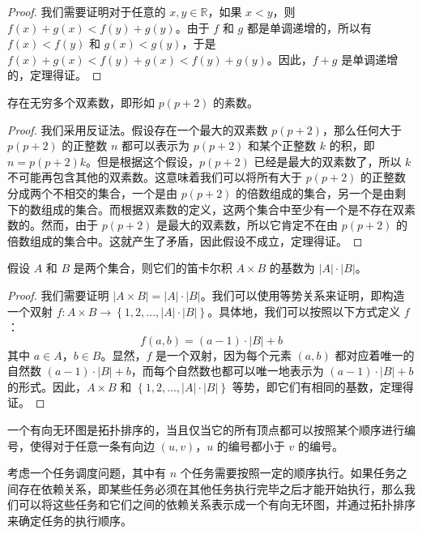 \begin{proof}
  我们需要证明对于任意的 $x,y \in \mathbb{R}$，如果 $x < y$，则 $f(x)+g(x) < f(y)+g(y)$。由于 $f$ 和 $g$ 都是单调递增的，所以有 $f(x) < f(y)$ 和 $g(x) < g(y)$，于是 $f(x)+g(x) < f(y)+g(x) < f(y)+g(y)$。因此，$f+g$ 是单调递增的，定理得证。
\end{proof}

\begin{conj}
  存在无穷多个双素数，即形如 $p(p+2)$ 的素数。
\end{conj}

\begin{proof}
  我们采用反证法。假设存在一个最大的双素数 $p(p+2)$，那么任何大于 $p(p+2)$ 的正整数 $n$ 都可以表示为 $p(p+2)$ 和某个正整数 $k$ 的积，即 $n = p(p+2)k$。但是根据这个假设，$p(p+2)$ 已经是最大的双素数了，所以 $k$ 不可能再包含其他的双素数。这意味着我们可以将所有大于 $p(p+2)$ 的正整数分成两个不相交的集合，一个是由 $p(p+2)$ 的倍数组成的集合，另一个是由剩下的数组成的集合。而根据双素数的定义，这两个集合中至少有一个是不存在双素数的。然而，由于 $p(p+2)$ 是最大的双素数，所以它肯定不在由 $p(p+2)$ 的倍数组成的集合中。这就产生了矛盾，因此假设不成立，定理得证。
\end{proof}

\begin{assume}
  假设 $A$ 和 $B$ 是两个集合，则它们的笛卡尔积 $A \times B$ 的基数为 $|A| \cdot |B|$。
\end{assume}

\begin{proof}
  我们需要证明 $|A \times B| = |A| \cdot |B|$。我们可以使用等势关系来证明，即构造一个双射 $f: A \times B \rightarrow \left\{1,2,\dots,|A| \cdot |B|\right\}$。具体地，我们可以按照以下方式定义 $f$：
  \begin{equation}
    f(a,b)=(a-1)\cdot |B|+b
  \end{equation}
  其中 $a \in A$，$b \in B$。显然，$f$ 是一个双射，因为每个元素 $(a,b)$ 都对应着唯一的自然数 $(a-1) \cdot |B| + b$，而每个自然数也都可以唯一地表示为 $(a-1) \cdot |B| + b$ 的形式。因此，$A \times B$ 和 $\left\{1,2,\dots,|A| \cdot |B|\right\}$ 等势，即它们有相同的基数，定理得证。
\end{proof}

\begin{dfn}
  一个有向无环图是拓扑排序的，当且仅当它的所有顶点都可以按照某个顺序进行编号，使得对于任意一条有向边 $(u,v)$，$u$ 的编号都小于 $v$ 的编号。
\end{dfn}

\begin{exmp}
  考虑一个任务调度问题，其中有 $n$ 个任务需要按照一定的顺序执行。如果任务之间存在依赖关系，即某些任务必须在其他任务执行完毕之后才能开始执行，那么我们可以将这些任务和它们之间的依赖关系表示成一个有向无环图，并通过拓扑排序来确定任务的执行顺序。
\end{exmp}

